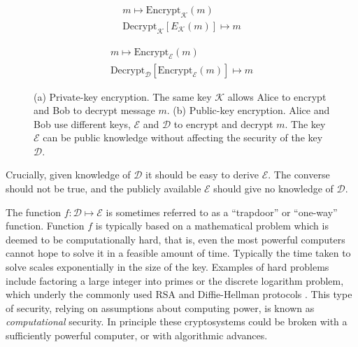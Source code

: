 \begin{figure}[htp]
\centering
\captionsetup{width=\linewidth}
\begin{framed}
\begin{subfigure}{0.4\textwidth}
\begin{align*}
m \mapsto \text{Encrypt}_\mathcal{K}\left(m\right) \\
\text{Decrypt}_\mathcal{K}\left[E_\mathcal{K}\left(m\right)\right] \mapsto m
\end{align*}
\caption{}
\end{subfigure}
\begin{subfigure}{0.4\textwidth}
\begin{align*}
m \mapsto \text{Encrypt}_\mathcal{E}\left(m\right) \\
\text{Decrypt}_\mathcal{D}\left[\text{Encrypt}_\mathcal{E}\left(m\right)\right] \mapsto m
\end{align*}
\caption{}
\end{subfigure}
\caption{(a) Private-key encryption. The same key $\mathcal{K}$ allows Alice to encrypt and Bob to decrypt message $m$. (b) Public-key encryption. Alice and Bob use different keys, $\mathcal{E}$ and $\mathcal{D}$ to encrypt and decrypt $m$. The key $\mathcal{E}$ can be public knowledge without affecting the security of the key $\mathcal{D}$.}
\label{fig:pubpriv}
\end{framed}
\end{figure}

Crucially, given knowledge of $\mathcal{D}$ it should be easy to derive $\mathcal{E}$. The converse should not be true, and the publicly available $\mathcal{E}$ should give no knowledge of $\mathcal{D}$. %

The function $f: \mathcal{D} \mapsto \mathcal{E}$ is sometimes referred to as a ``trapdoor'' or ``one-way'' function. Function $f$ is typically based on a mathematical problem which is deemed to be computationally hard, that is, even the most powerful computers cannot hope to solve it in a feasible amount of time. Typically the time taken to solve scales exponentially in the size of the key. Examples of hard problems include factoring a large integer into primes or the discrete logarithm problem, which underly the commonly used RSA  and Diffie-Hellman protocols \cite{Rivest1978, Diffie1976, Schneier1996}. This type of security, relying on assumptions about computing power, is known as \emph{computational} security. In principle these cryptosystems could be broken with a sufficiently powerful computer, or with algorithmic advances.

